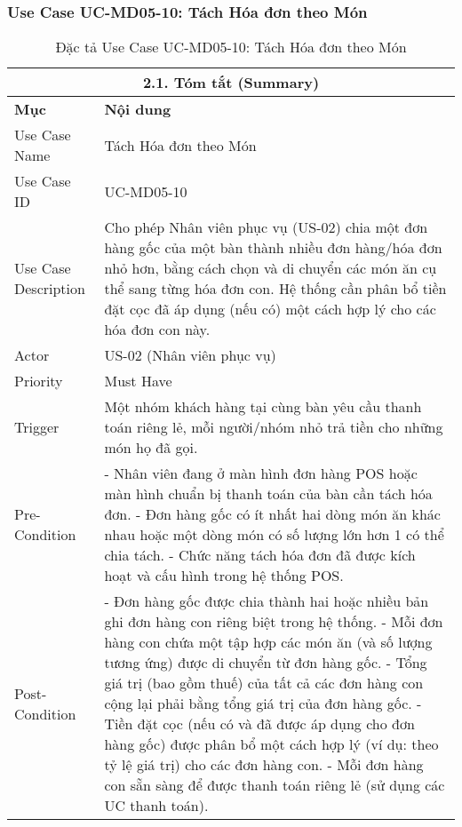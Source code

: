 \subsubsection{Use Case UC-MD05-10: Tách Hóa đơn theo Món}
\begin{longtable}{|m{4cm}|p{11cm}|}
\caption{Đặc tả Use Case UC-MD05-10: Tách Hóa đơn theo Món} \label{tab:uc_md05_10_final} \\
\hline
\multicolumn{2}{|c|}{\textbf{2.1. Tóm tắt (Summary)}} \\
\hline
\textbf{Mục} & \textbf{Nội dung} \\
\hline
\endhead %
\hline
\endfoot %
\hline
\endlastfoot %
Use Case Name & Tách Hóa đơn theo Món \\
\hline
Use Case ID & UC-MD05-10 \\
\hline
Use Case Description & Cho phép Nhân viên phục vụ (US-02) chia một đơn hàng gốc của một bàn thành nhiều đơn hàng/hóa đơn nhỏ hơn, bằng cách chọn và di chuyển các món ăn cụ thể sang từng hóa đơn con. Hệ thống cần phân bổ tiền đặt cọc đã áp dụng (nếu có) một cách hợp lý cho các hóa đơn con này. \\
\hline
Actor & US-02 (Nhân viên phục vụ) \\
\hline
Priority & Must Have \\
\hline
Trigger & Một nhóm khách hàng tại cùng bàn yêu cầu thanh toán riêng lẻ, mỗi người/nhóm nhỏ trả tiền cho những món họ đã gọi. \\
\hline
Pre-Condition & - Nhân viên đang ở màn hình đơn hàng POS hoặc màn hình chuẩn bị thanh toán của bàn cần tách hóa đơn. \newline - Đơn hàng gốc có ít nhất hai dòng món ăn khác nhau hoặc một dòng món có số lượng lớn hơn 1 có thể chia tách. \newline - Chức năng tách hóa đơn đã được kích hoạt và cấu hình trong hệ thống POS. \\
\hline
Post-Condition & - Đơn hàng gốc được chia thành hai hoặc nhiều bản ghi đơn hàng con riêng biệt trong hệ thống. \newline - Mỗi đơn hàng con chứa một tập hợp các món ăn (và số lượng tương ứng) được di chuyển từ đơn hàng gốc. \newline - Tổng giá trị (bao gồm thuế) của tất cả các đơn hàng con cộng lại phải bằng tổng giá trị của đơn hàng gốc. \newline - Tiền đặt cọc (nếu có và đã được áp dụng cho đơn hàng gốc) được phân bổ một cách hợp lý (ví dụ: theo tỷ lệ giá trị) cho các đơn hàng con. \newline - Mỗi đơn hàng con sẵn sàng để được thanh toán riêng lẻ (sử dụng các UC thanh toán). \\

\end{longtable}
